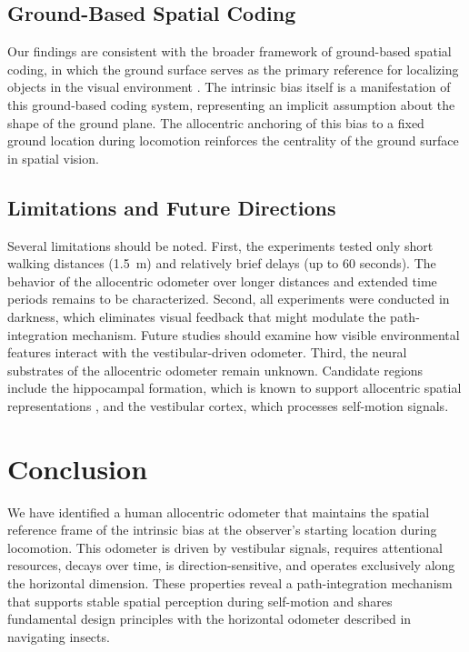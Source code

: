 \documentclass[12pt]{article}
\begin{document}
\subsection{Ground-Based Spatial Coding}

Our findings are consistent with the broader framework of ground-based spatial coding, in which the ground surface serves as the primary reference for localizing objects in the visual environment \citep{ooi2001, wu2004, he2004}. The intrinsic bias itself is a manifestation of this ground-based coding system, representing an implicit assumption about the shape of the ground plane. The allocentric anchoring of this bias to a fixed ground location during locomotion reinforces the centrality of the ground surface in spatial vision.

\subsection{Limitations and Future Directions}

Several limitations should be noted. First, the experiments tested only short walking distances (1.5~m) and relatively brief delays (up to 60 seconds). The behavior of the allocentric odometer over longer distances and extended time periods remains to be characterized. Second, all experiments were conducted in darkness, which eliminates visual feedback that might modulate the path-integration mechanism. Future studies should examine how visible environmental features interact with the vestibular-driven odometer. Third, the neural substrates of the allocentric odometer remain unknown. Candidate regions include the hippocampal formation, which is known to support allocentric spatial representations \citep{okeefe1978, moser2008}, and the vestibular cortex, which processes self-motion signals.

\section{Conclusion}

We have identified a human allocentric odometer that maintains the spatial reference frame of the intrinsic bias at the observer's starting location during locomotion. This odometer is driven by vestibular signals, requires attentional resources, decays over time, is direction-sensitive, and operates exclusively along the horizontal dimension. These properties reveal a path-integration mechanism that supports stable spatial perception during self-motion and shares fundamental design principles with the horizontal odometer described in navigating insects.



\end{document}

